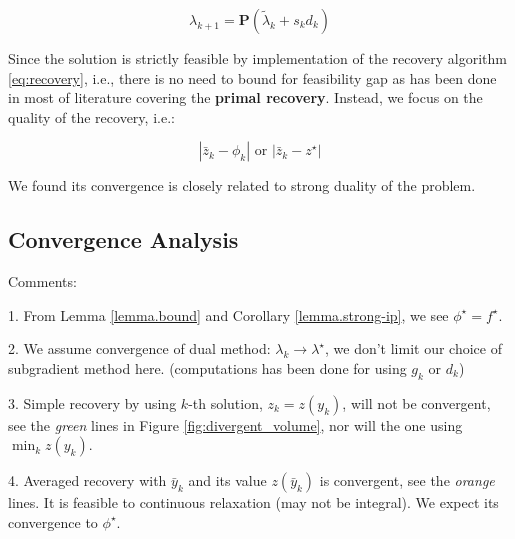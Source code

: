 \documentclass[../main]{subfiles}
\begin{document}
\[\lambda_{k+1} = \mathbf{P}(\tilde\lambda_{k} + s_{k}d_{k})\]

Since the solution is strictly feasible by implementation of the
recovery algorithm \eqref{eq:recovery}, i.e., there is no need to bound for feasibility gap
as has been done in most of literature covering the \textbf{primal
  recovery}. Instead, we focus on the quality of the recovery, i.e.:

\[
  |\bar z_k - \phi_k| \textrm { or } |\bar z_k - z^\star|
\]

We found its convergence is closely related to strong duality of the problem.

\subsection{Convergence Analysis}\label{dual.analysis}

Comments:

1. From Lemma \ref{lemma.bound} and Corollary \ref{lemma.strong-ip}, we see \(\phi^\star = f^\star\).

2. We assume convergence of dual method: \(\lambda_k \to \lambda^\star\), we don't limit our choice of subgradient method here. (computations has been done for using \(g_k\) or \(d_k\))

3. Simple recovery by using \(k\)-th solution, \(z_k = z(y_k)\), will not be convergent, see the \emph{green} lines in Figure \ref{fig:divergent_volume}, nor will the one using \(\min_k z(y_k)\).

4. Averaged recovery with \(\bar y_k\) and its value \(z(\bar y_k)\) is convergent, see the \emph{orange} lines. It is feasible to continuous relaxation (may not be integral). We expect its convergence to \(\phi^\star\).



\end{document}
